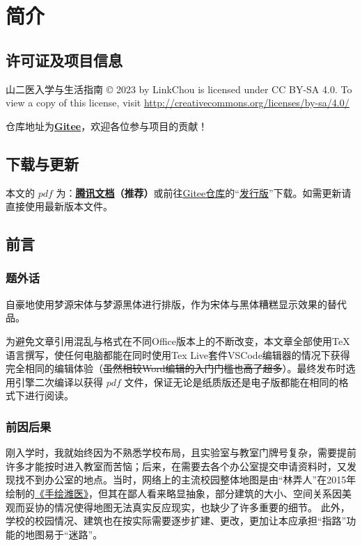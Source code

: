 \chapter[简介]{简介}

\section[许可证及项目信息]{许可证及项目信息}
山二医入学与生活指南 © 2023 by LinkChou is licensed under CC BY-SA 4.0. To view a copy of this license, visit \uline{\href{http://creativecommons.org/licenses/by-sa/4.0/}{http://creativecommons.org/licenses/by-sa/4.0/}}

仓库地址为\textbf{\uline{\href{https://gitee.com/mikazo/guide_for_freshman}{Gitee}}}，欢迎各位参与项目的贡献！

\section[\textcolor{red}{下载与更新}]{下载与更新}
本文的 $pdf$ \textbf{}为：\textbf{\uline{\textcolor{red}{\href{https://docs.qq.com/s/ETcQ-ZFSrSsh6MK9bm773q}{腾讯文档}}}（推荐）}或前往\uline{\href{https://gitee.com/mikazo/guide_for_freshman}{Gitee仓库}}的“\uline{\href{https://gitee.com/mikazo/latex_version/releases/latest}{发行版}}”下载。如需更新请直接使用最新版本文件。

\section[前言]{前言}
\subsection[题外话]{题外话}
自豪地使用梦源宋体与梦源黑体进行排版，作为宋体与黑体糟糕显示效果的替代品。

为避免文章引用混乱与格式在不同Office版本上的不断改变，本文章全部使用\TeX 语言撰写，使任何电脑都能在同时使用Tex Live套件VSCode编辑器\footnotemark 的情况下获得完全相同的编辑体验（\sout{虽然相较Word编辑的入门门槛也高了超多}）。最终发布时选用\XeLaTeX 引擎二次编译以获得 $pdf$ 文件，保证无论是纸质版还是电子版都能在相同的格式下进行阅读。

\subsection[前因后果]{前因后果}
刚入学时，我就始终因为不熟悉学校布局，且实验室与教室门牌号复杂，需要提前许多才能按时进入教室而苦恼；后来，在需要去各个办公室提交申请资料时，又发现找不到办公室的地点。当时，网络上的主流校园整体地图是由“林弄人”在2015年绘制的\uline{\href{https://www.zcool.com.cn/work/ZMTgxMDQwMjg=.html?}{《手绘潍医》}}，但其在鄙人看来略显抽象，部分建筑的大小、空间关系因美观而妥协的情况使得地图无法真实反应现实，也缺少了许多重要的细节。%
此外，学校的校园情况、建筑也在按实际需要逐步扩建、更改，更加让本应承担“指路”功能的地图易于“迷路”。

